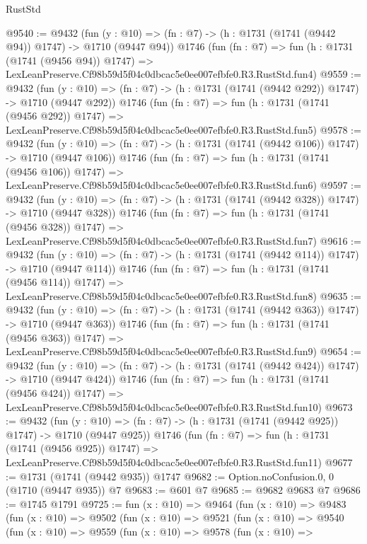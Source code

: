 \begin{lexlean}{RustStd}
\begin{coremodule}
@9540 := @9432
    (fun (y : @10) => (fn : @7) -> (h : @1731 (@1741 (@9442 @94)) @1747) -> @1710 (@9447 @94))
    @1746
    (fun (fn : @7) =>
    fun (h : @1731 (@1741 (@9456 @94)) @1747) =>
    LexLeanPreserve.Cf98b59d5f04c0dbcac5e0ee007efbfe0.R3.RustStd.fun4)
@9559 := @9432
    (fun (y : @10) => (fn : @7) -> (h : @1731 (@1741 (@9442 @292)) @1747) -> @1710 (@9447 @292))
    @1746
    (fun (fn : @7) =>
    fun (h : @1731 (@1741 (@9456 @292)) @1747) =>
    LexLeanPreserve.Cf98b59d5f04c0dbcac5e0ee007efbfe0.R3.RustStd.fun5)
@9578 := @9432
    (fun (y : @10) => (fn : @7) -> (h : @1731 (@1741 (@9442 @106)) @1747) -> @1710 (@9447 @106))
    @1746
    (fun (fn : @7) =>
    fun (h : @1731 (@1741 (@9456 @106)) @1747) =>
    LexLeanPreserve.Cf98b59d5f04c0dbcac5e0ee007efbfe0.R3.RustStd.fun6)
@9597 := @9432
    (fun (y : @10) => (fn : @7) -> (h : @1731 (@1741 (@9442 @328)) @1747) -> @1710 (@9447 @328))
    @1746
    (fun (fn : @7) =>
    fun (h : @1731 (@1741 (@9456 @328)) @1747) =>
    LexLeanPreserve.Cf98b59d5f04c0dbcac5e0ee007efbfe0.R3.RustStd.fun7)
@9616 := @9432
    (fun (y : @10) => (fn : @7) -> (h : @1731 (@1741 (@9442 @114)) @1747) -> @1710 (@9447 @114))
    @1746
    (fun (fn : @7) =>
    fun (h : @1731 (@1741 (@9456 @114)) @1747) =>
    LexLeanPreserve.Cf98b59d5f04c0dbcac5e0ee007efbfe0.R3.RustStd.fun8)
@9635 := @9432
    (fun (y : @10) => (fn : @7) -> (h : @1731 (@1741 (@9442 @363)) @1747) -> @1710 (@9447 @363))
    @1746
    (fun (fn : @7) =>
    fun (h : @1731 (@1741 (@9456 @363)) @1747) =>
    LexLeanPreserve.Cf98b59d5f04c0dbcac5e0ee007efbfe0.R3.RustStd.fun9)
@9654 := @9432
    (fun (y : @10) => (fn : @7) -> (h : @1731 (@1741 (@9442 @424)) @1747) -> @1710 (@9447 @424))
    @1746
    (fun (fn : @7) =>
    fun (h : @1731 (@1741 (@9456 @424)) @1747) =>
    LexLeanPreserve.Cf98b59d5f04c0dbcac5e0ee007efbfe0.R3.RustStd.fun10)
@9673 := @9432
    (fun (y : @10) => (fn : @7) -> (h : @1731 (@1741 (@9442 @925)) @1747) -> @1710 (@9447 @925))
    @1746
    (fun (fn : @7) =>
    fun (h : @1731 (@1741 (@9456 @925)) @1747) =>
    LexLeanPreserve.Cf98b59d5f04c0dbcac5e0ee007efbfe0.R3.RustStd.fun11)
@9677 := @1731 (@1741 (@9442 @935)) @1747
@9682 := Option.noConfusion.{0, 0} (@1710 (@9447 @935)) @7
@9683 := @601 @7
@9685 := @9682 @9683 @7
@9686 := @1745 @1791
@9725 := fun (x : @10) =>
  @9464
    (fun (x : @10) =>
    @9483
      (fun (x : @10) =>
      @9502
        (fun (x : @10) =>
        @9521
          (fun (x : @10) =>
          @9540
            (fun (x : @10) =>
            @9559
              (fun (x : @10) =>
              @9578
                (fun (x : @10) =>

\end{coremodule}
\end{lexlean}
